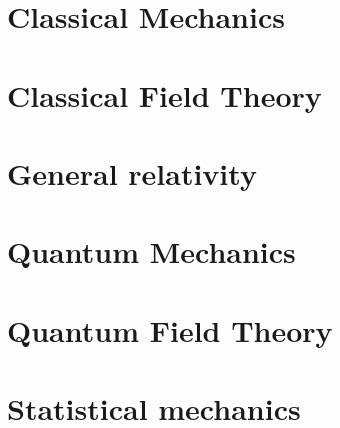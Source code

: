 \documentclass[cyan]{elegantnote}
\author{Yuyang Songsheng}
\begin{document}
\maketitle
\tableofcontents
\part{Classical Mechanics}

\part{Classical Field Theory}

\part{General relativity}

\part{Quantum Mechanics}


\part{Quantum Field Theory}



\part{Statistical mechanics}

\end{document}
